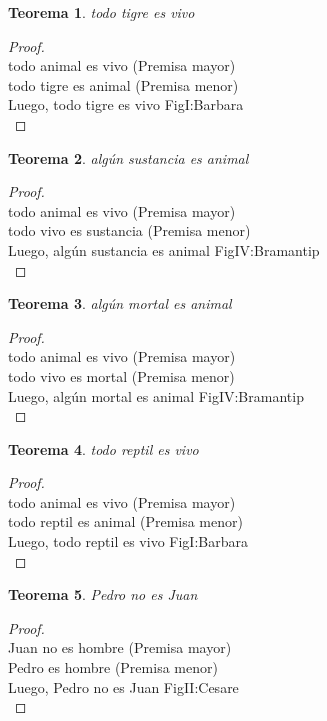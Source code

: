 ﻿\documentclass[12pt]{book}
\newtheorem{theorem}{Teorema}[chapter]
\newtheorem{proof}{Demostración}
\begin{document}
\begin{theorem}
todo tigre es vivo
\label{th: 17}
\end{theorem}\begin{proof}\\todo animal es vivo	 (Premisa mayor) \\todo tigre es animal	 (Premisa menor) \\Luego, todo tigre es vivo	FigI:Barbara \\ \end{proof}
\begin{theorem}
algún sustancia es animal
\label{th: 18}
\end{theorem}\begin{proof}\\todo animal es vivo	 (Premisa mayor) \\todo vivo es sustancia	 (Premisa menor) \\Luego, algún sustancia es animal	FigIV:Bramantip \\ \end{proof}
\begin{theorem}
algún mortal es animal
\label{th: 19}
\end{theorem}\begin{proof}\\todo animal es vivo	 (Premisa mayor) \\todo vivo es mortal	 (Premisa menor) \\Luego, algún mortal es animal	FigIV:Bramantip \\ \end{proof}
\begin{theorem}
todo reptil es vivo
\label{th: 20}
\end{theorem}\begin{proof}\\todo animal es vivo	 (Premisa mayor) \\todo reptil es animal	 (Premisa menor) \\Luego, todo reptil es vivo	FigI:Barbara \\ \end{proof}
\begin{theorem}
Pedro no es Juan
\label{th: 21}
\end{theorem}\begin{proof}\\Juan no es hombre	 (Premisa mayor) \\Pedro es hombre	 (Premisa menor) \\Luego, Pedro no es Juan	FigII:Cesare \\ \end{proof}
\end{document}
